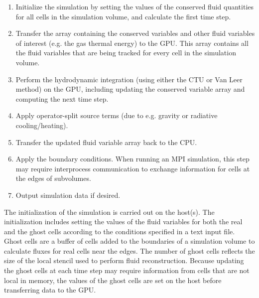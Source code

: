 \documentclass[11pt,letterpaper,english]{article}
\begin{document}
\begin{enumerate}\itemsep0pt
\item Initialize the simulation by setting the values of the conserved fluid quantities for all cells in the simulation volume, and calculate the first time step.

\item Transfer the array containing the conserved variables and other fluid variables of interest (e.g. the gas thermal energy) to the GPU. This array contains all the fluid variables that are being tracked for every cell in the simulation volume.

\item Perform the hydrodynamic integration (using either the CTU or Van Leer method) on the GPU, including updating the conserved variable array and computing the next time step.

\item Apply operator-split source terms (due to e.g. gravity or radiative cooling/heating).

\item Transfer the updated fluid variable array back to the CPU.

\item Apply the boundary conditions. When running an MPI simulation, this step may require interprocess communication to exchange information for cells at the edges of subvolumes.

\item Output simulation data if desired.

\end{enumerate}

The initialization of the simulation is carried out on the host(s). The initialization includes setting the values of the fluid variables for both the real and the ghost cells according to the conditions specified in a text input file. Ghost cells are a buffer of cells added to the boundaries of a simulation volume to calculate fluxes for real cells near the edges. The number of ghost cells reflects the size of the local stencil used to perform fluid reconstruction. Because updating the ghost cells at each time step may require information from cells that are not local in memory, the values of the ghost cells are set on the host before transferring data to the GPU.
\end{document}
